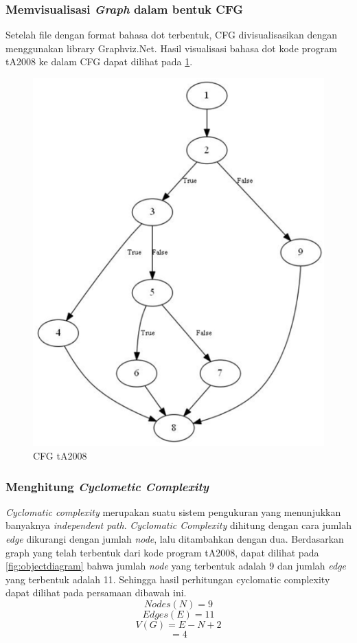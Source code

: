 \subsubsection*{Memvisualisasi \textit{Graph} dalam bentuk CFG}
Setelah file dengan format bahasa dot terbentuk, CFG divisualisasikan dengan menggunakan library Graphviz.Net. Hasil visualisasi bahasa dot kode program tA2008 ke dalam CFG dapat dilihat pada \ref{fig:cfgta2008}.
\begin{figure}
	\centering
	\includegraphics[width=0.9\linewidth]{gambar/cfgtA2008}
	\caption{CFG tA2008}
	\label{fig:cfgta2008}
\end{figure}

\subsubsection*{Menghitung \textit{Cyclometic Complexity}}

\textit{Cyclomatic complexity} merupakan suatu sistem pengukuran yang menunjukkan banyaknya \textit{independent path}. \textit{Cyclomatic Complexity }dihitung dengan cara jumlah \textit{edge} dikurangi dengan jumlah \textit{node}, lalu ditambahkan dengan dua. Berdasarkan graph yang telah terbentuk dari kode program tA2008, dapat dilihat pada \ref{fig:objectdiagram} bahwa jumlah \textit{node} yang terbentuk adalah 9 dan jumlah \textit{edge} yang terbentuk adalah 11. Sehingga hasil perhitungan cyclomatic complexity dapat dilihat pada persamaan dibawah ini.
\[Nodes (N) = 9\]
\[Edges (E) = 11\]
\[V(G) = E - N + 2\]
\[     = 4\]

